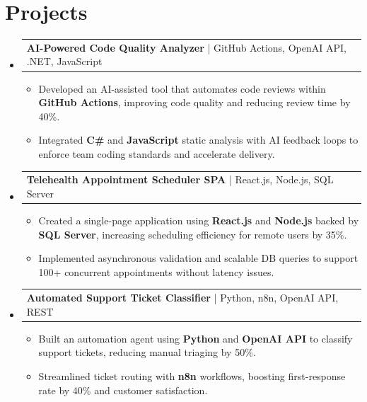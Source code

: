 \documentclass[letterpaper,11pt]{article}
\makeatletter
\newcommand{\resumeItem}[1]{
  \item\footnotesize{
    {#1 \vspace{-2pt}}
  }
}
\newcommand{\resumeProjectHeading}[2]{
    \item
    \begin{tabular*}{1.001\textwidth}{l@{\extracolsep{\fill}}r}
      \small#1 & \textbf{\small #2}\\
    \end{tabular*}\vspace{-7pt}
}
\newcommand{\resumeSubHeadingListStart}{\begin{itemize}[leftmargin=0pt, label={}]}
\newcommand{\resumeSubHeadingListEnd}{\end{itemize}}
\newcommand{\resumeItemListStart}{\begin{itemize}[leftmargin=*]}
\newcommand{\resumeItemListEnd}{\end{itemize}\vspace{-5pt}}
\makeatother
\begin{document}
\section{Projects}
    \vspace{-5pt}
    \resumeSubHeadingListStart
      \resumeProjectHeading
          {\textbf{AI-Powered Code Quality Analyzer} | GitHub Actions, OpenAI API, .NET, JavaScript}{}
          \resumeItemListStart
              \resumeItem{Developed an AI-assisted tool that automates code reviews within \textbf{GitHub Actions}, improving code quality and reducing review time by 40\%.}
              \resumeItem{Integrated \textbf{C\#} and \textbf{JavaScript} static analysis with AI feedback loops to enforce team coding standards and accelerate delivery.}
          \resumeItemListEnd
          \vspace{-12pt}
      \resumeProjectHeading
          {\textbf{Telehealth Appointment Scheduler SPA} | React.js, Node.js, SQL Server}{}
          \resumeItemListStart
              \resumeItem{Created a single-page application using \textbf{React.js} and \textbf{Node.js} backed by \textbf{SQL Server}, increasing scheduling efficiency for remote users by 35\%.}
              \resumeItem{Implemented asynchronous validation and scalable DB queries to support 100+ concurrent appointments without latency issues.}
          \resumeItemListEnd
          \vspace{-12pt}
      \resumeProjectHeading
          {\textbf{Automated Support Ticket Classifier} | Python, n8n, OpenAI API, REST}{}
          \resumeItemListStart
              \resumeItem{Built an automation agent using \textbf{Python} and \textbf{OpenAI API} to classify support tickets, reducing manual triaging by 50\%.}
              \resumeItem{Streamlined ticket routing with \textbf{n8n} workflows, boosting first-response rate by 40\% and customer satisfaction.}
          \resumeItemListEnd 
    \resumeSubHeadingListEnd
\end{document}
